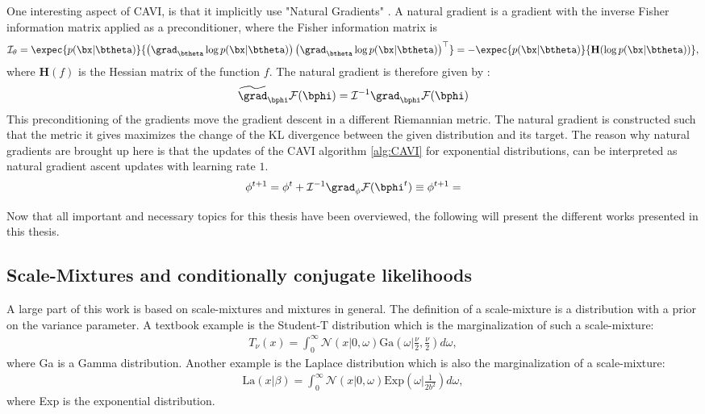 One interesting aspect of \ac{CAVI}, is that it implicitly use "Natural Gradients" \cite{amariNaturalGradientWorks1998}.
A natural gradient is a gradient with the inverse Fisher information matrix applied as a preconditioner, where the Fisher information matrix is
\begin{align}
    \mathcal{I}_\theta = \expec{p(\bx|\btheta)}{\left(\grad_{\btheta}\log p(\bx|\btheta)\right)\left(\grad_{\btheta} \log p(\bx|\btheta)\right)^\top} = -\expec{p(\bx|\btheta)}{\mathbf{H}(\log p(\bx|\btheta))},
    \label{eq:fisherinfomatrix}
\end{align}
where $\mathbf{H}(f)$ is the Hessian matrix of the function $f$.
The natural gradient is therefore given by :
\begin{align*}
    \widetilde{\grad}_{\bphi}\mathcal{F}(\bphi) = \mathcal{I}^{-1} \grad_{\bphi}\mathcal{F}(\bphi)
\end{align*}
This preconditioning of the gradients move the gradient descent in a different Riemannian metric.
The natural gradient is constructed such that the metric it gives maximizes the change of the \ac{KL} divergence between the given distribution and its target.
The reason why natural gradients are brought up here is that the updates of the \ac{CAVI} algorithm \ref{alg:CAVI} for exponential distributions, can be interpreted as natural gradient ascent updates with learning rate $1$.
\begin{align*}
    \phi^{t+1} = \phi^t + \mathcal{I}^{-1}\grad_{\phi}\mathcal{F}(\bphi^t) \equiv \phi^{t+1} = 
\end{align*}

Now that all important and necessary topics for this thesis have been overviewed, the following will present the different works presented in this thesis. 

\subsection{Scale-Mixtures and conditionally conjugate likelihoods}

A large part of this work is based on scale-mixtures and mixtures in general.
The definition of a scale-mixture is a distribution with a prior on the variance parameter.
A textbook example is the Student-T distribution which is the marginalization of such a scale-mixture:
\begin{align*}
    T_\nu(x) = \int_{0}^\infty \mathcal{N}\left(x|0,\omega\right)\mathrm{Ga}\left(\omega|\frac{\nu}{2}, \frac{\nu}{2}\right)d\omega,
\end{align*}
where Ga is a Gamma distribution.
Another example is the Laplace distribution which is also the marginalization of a scale-mixture:
\begin{align*}
    \mathrm{La}(x|\beta) = \int_0^{\infty} \mathcal{N}(x|0,\omega)\mathrm{Exp}\left(\omega|\frac{1}{2b^2}\right)d\omega,
\end{align*}
where Exp is the exponential distribution.

